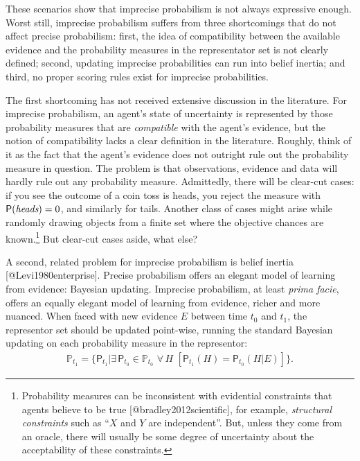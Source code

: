 \documentclass[
  letterpaper,
  DIV=11,
  numbers=noendperiod]{scrartcl}
\begin{document}
These scenarios show that imprecise probabilism is not always expressive
enough. Worst still, imprecise probabilism suffers from three
shortcomings that do not affect precise probabilism: first, the idea of
compatibility between the available evidence and the probability
measures in the representator set is not clearly defined; second,
updating imprecise probabilities can run into belief inertia; and third,
no proper scoring rules exist for imprecise probabilities.

The first shortcoming has not received extensive discussion in the
literature. For imprecise probabilism, an agent's state of uncertainty
is represented by those probability measures that are \emph{compatible}
with the agent's evidence, but the notion of compatibility lacks a clear
definition in the literature. Roughly, think of it as the fact that the
agent's evidence does not outright rule out the probability measure in
question. The problem is that observations, evidence and data will
hardly rule out any probability measure. Admittedly, there will be
clear-cut cases: if you see the outcome of a coin toss is heads, you
reject the measure with \(\mathsf{P}(\emph{heads})=0\), and similarly
for tails. Another class of cases might arise while randomly drawing
objects from a finite set where the objective chances are
known.\footnote{Probability measures can be inconsistent with evidential
  constraints that agents believe to be true
  {[}@bradley2012scientific{]}, for example,
  \emph{structural constraints} such as ``\(X\) and \(Y\) are
  independent''. But, unless they come from an oracle, there will
  usually be some degree of uncertainty about the acceptability of these
  constraints.} But clear-cut cases aside, what else?

A second, related problem for imprecise probabilism is belief inertia
{[}@Levi1980enterprise{]}. Precise probabilism offers an elegant model
of learning from evidence: Bayesian updating. Imprecise probabilism, at
least \emph{prima facie}, offers an equally elegant model of learning
from evidence, richer and more nuanced. When faced with new evidence
\(E\) between time \(t_0\) and \(t_1\), the representor set should be
updated point-wise, running the standard Bayesian updating on each
probability measure in the representor:
\begin{align*} \label{eq:updateRepresentor}
\mathbb{P}_{t_1} = \{\mathsf{P}_{t_1}\vert \exists\, {\mathsf{P}_{t_0} \!\in  \mathbb{P}_{t_0}}\,\, \forall\, {H}\,\, \left[\mathsf{P}_{t_1}(H)=\mathsf{P}_{t_0}(H \vert E)\right] \}.
\end{align*}
\end{document}
